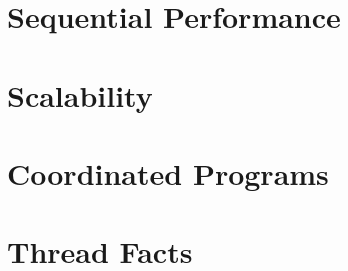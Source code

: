 \section{Sequential Performance}
\section{Scalability}
\section{Coordinated Programs}
\section{Thread Facts}
